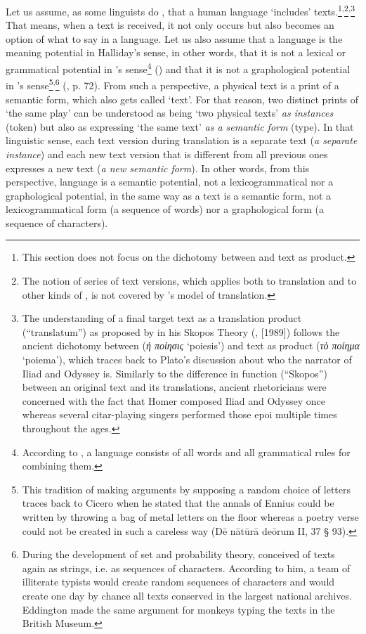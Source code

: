 \documentclass[output=paper]{LSP/langsci}
\begin{document}
Let us assume, as some linguists do \citep{Hasan:1999um}, that a human language `includes' texts.\footnote{This section does not focus on the dichotomy between  and text as product.}\textsuperscript{,}\footnote{The notion of series of text versions, which applies both to translation and to other kinds of , is not covered by \citeauthor{Vermeer:2004tw}'s model of translation.}\textsuperscript{,}\footnote{The understanding of a final target text as a translation product (``translatum'') as proposed by \citeauthor{Vermeer:2004tw} in his Skopos Theory (\citeauthor{Vermeer:2004tw}, \citeyear{Vermeer:2004tw}[1989]) follows the ancient dichotomy between  (\textit{ἡ ποίησις} `poiesis') and text as product (\textit{τὸ ποίημα} `poiema'), which traces back to Plato's discussion about who the narrator of Iliad and Odyssey is. Similarly to the difference in function (``Skopos'') between an original text and its translations, ancient rhetoricians were concerned with the fact that Homer composed Iliad and Odyssey once whereas several citar-playing singers performed those epoi multiple times throughout the ages.} That means, when a text is received, it not only occurs but also becomes an option of what to say in a language. Let us also assume that a language is the meaning potential in Halliday's sense, in other words, that it is not a lexical or grammatical potential in \citeauthor{Chomsky:1957bv}'s sense\footnote{According to \citeauthor{Chomsky:1957bv}, a language consists of all words and all grammatical rules for combining them.} (\citeyear{Chomsky:1957bv}) and that it is not a graphological potential in \citeauthor{Eddington:1929vg}'s sense\footnote{This tradition of making arguments by supposing a random choice of letters traces back to Cicero when he stated that the annals of Ennius could be written by throwing a bag of metal letters on the floor whereas a poetry verse could not be created in such a careless way (D\={e} n\={a}t\={u}r\={a} de\={o}rum II, 37 § 93).}\textsuperscript{,}\footnote{During the development of set and probability theory, \citet[p. 194]{Borel:1913vy} conceived of texts again as strings, i.e. as sequences of characters. According to him, a team of illiterate typists would create random sequences of characters and would create one day by chance all texts conserved in the largest national archives. Eddington made the same argument for monkeys typing the texts in the British Museum.} (\citeyear{Eddington:1929vg}, p. 72). From such a perspective, a physical text is a print of a semantic form, which also gets called `text'. For that reason, two distinct prints of `the same play' can be understood as being `two physical texts' \emph{as instances} (token) but also as expressing `the same text' \emph{as a semantic form} (type). In that linguistic sense, each text version during translation is a separate text (\emph{a separate instance}) and each new text version that is different from all previous ones expresses a new text (\emph{a new semantic form}). In other words, from this perspective, language is a semantic potential, not a lexicogrammatical nor a graphological potential, in the same way as a text is a semantic form, not a lexicogrammatical form (a sequence of words) nor a graphological form (a sequence of characters).
\end{document}
